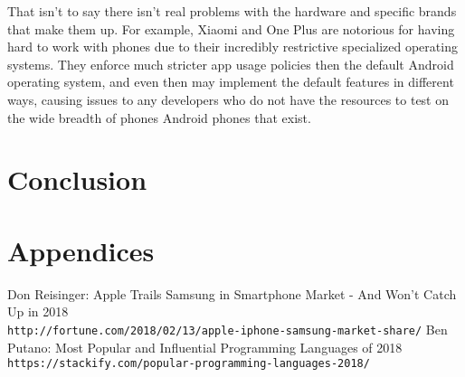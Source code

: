 \documentclass[12pt, letterpaper]{article}
\begin{document}
That isn't to say there isn't real problems with the hardware and specific
brands that make them up. For example, Xiaomi and One Plus are notorious
for having hard to work with phones due to their incredibly restrictive
specialized operating systems. They enforce much stricter app usage policies
then the default Android operating system, and even then may implement the
default features in different ways, causing issues to any developers who
do not have the resources to test on the wide breadth of phones Android
phones that exist.

\section{Conclusion}

\section{Appendices}

\begin{thebibliography}{9}
Don Reisinger: Apple Trails Samsung in Smartphone Market - And Won't Catch Up in 2018
\\\texttt{http://fortune.com/2018/02/13/apple-iphone-samsung-market-share/}
Ben Putano: Most Popular and Influential Programming Languages of 2018
\\\texttt{https://stackify.com/popular-programming-languages-2018/}
\end{thebibliography}
\end{document}
